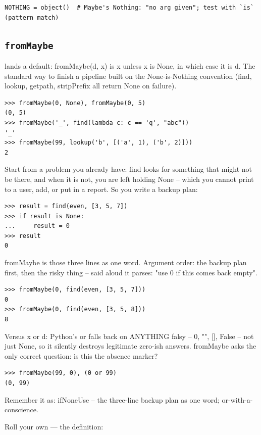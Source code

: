 \documentclass[10pt,letterpaper]{book}
\begin{document}
\begin{lstlisting}[style=ex]
NOTHING = object()  # Maybe's Nothing: "no arg given"; test with `is` (pattern match)
\end{lstlisting}
\subsection{\texttt{fromMaybe}}\label{def:fromMaybe}
lands a default: fromMaybe(d, x) is x unless x is None, in which case it is d. The standard way to finish a pipeline built on the None-is-Nothing convention (find, lookup, getpath, stripPrefix all return None on failure).
\begin{lstlisting}[style=ex]
>>> fromMaybe(0, None), fromMaybe(0, 5)
(0, 5)
>>> fromMaybe('_', find(lambda c: c == 'q', "abc"))
'_'
>>> fromMaybe(99, lookup('b', [('a', 1), ('b', 2)]))
2
\end{lstlisting}

Start from a problem you already have: find looks for something that might not be there, and when it is not, you are left holding None -- which you cannot print to a user, add, or put in a report. So you write a backup plan:

\begin{lstlisting}[style=ex]
>>> result = find(even, [3, 5, 7])
>>> if result is None:
...     result = 0
>>> result
0
\end{lstlisting}

fromMaybe is those three lines as one word. Argument order: the backup plan first, then the risky thing -- said aloud it parses: "use 0 if this comes back empty".

\begin{lstlisting}[style=ex]
>>> fromMaybe(0, find(even, [3, 5, 7]))
0
>>> fromMaybe(0, find(even, [3, 5, 8]))
8
\end{lstlisting}

Versus x or d: Python's or falls back on ANYTHING falsy -- 0, "", [], False -- not just None, so it silently destroys legitimate zero-ish answers. fromMaybe asks the only correct question: is this the absence marker?

\begin{lstlisting}[style=ex]
>>> fromMaybe(99, 0), (0 or 99)
(0, 99)
\end{lstlisting}

Remember it as: ifNoneUse -- the three-line backup plan as one word; or-with-a-conscience.


Roll your own --- the definition:
\end{document}
